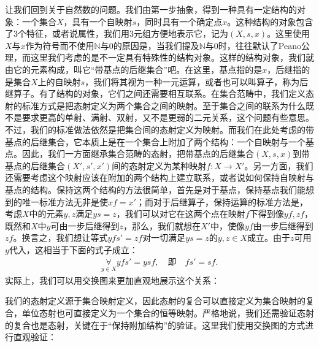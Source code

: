 \documentclass[oneside, 12pt]{ctexart}
\begin{document}
让我们回到关于自然数的问题。我们由第一步抽象，得到一种具有一定结构的对象：一个集合$X$，具有一个自映射$s$，同时具有一个确定点$x$。这种结构的对象包含了$3$个特征，或者说属性，我们用$3$元组方便地表示它，记为$(X, s, x)$。这里使用$X$与$x$作为符号而不使用$\mathbb{N}$与$0$的原因是，当我们提及$\mathbb{N}$与$0$时，往往默认了Peano公理，而这里我们考虑的是不一定具有特殊性的结构对象。这样的结构对象，我们就由它的元素构成，叫它“带基点的后继集合”吧。在这里，基点指的是$x$，后继指的是集合$X$上的自映射$s$，我们将其视为一种一元运算，或者也可以叫算子，称为后继算子。有了结构的对象，它们之间还需要相互联系。在集合范畴中，我们定义态射的标准方式是把态射定义为两个集合之间的映射。至于集合之间的联系为什么既不是要求更高的单射、满射、双射，又不是更弱的二元关系，这个问题有些意思。不过，我们的标准做法依然是把集合间的态射定义为映射。而我们在此处考虑的带基点的后继集合，它本质上是在一个集合上附加了两个结构：一个自映射与一个基点。因此，我们一方面继承集合范畴的态射，把带基点的后继集合$(X, s, x)$到带基点的后继集合$(X', s', x')$间的态射定义为某种映射$f \colon X \to X'$。另一方面，我们还需要考虑这个映射应该在附加的两个结构上建立联系，或者说如何保持自映射与基点的结构。保持这两个结构的方法很简单，首先是对于基点，保持基点我们能想到的唯一标准方法无非是使$xf = x'$；而对于后继算子，保持运算的标准方法是，考虑$X$中的元素$y, z$满足$ys = z$，我们可以对它在这两个点在映射$f$下得到像$yf, zf$，既然和$X$中$y$可由一步后继得到$z$，那么，我们就想在$X'$中，使像$yf$由一步后继得到$zf$。换言之，我们想让等式$yfs' = zf$对一切满足$ys = z$的$y,z \in X$成立。由于$z$可用$y$代入，这相当于下面的式子成立：
\begin{gather*}
	\mathop{\forall}\limits_{y \in X} yfs' = ysf, \quad \text{即} \quad fs' = sf.
\end{gather*}
实际上，我们可以用交换图来更加直观地展示这个关系：
\begin{center}
\end{center}
我们的态射定义源于集合映射定义，因此态射的复合可以直接定义为集合映射的复合，单位态射也可直接定义为一个集合的恒等映射。严格地说，我们还需验证态射的复合也是态射，关键在于“保持附加结构”的验证。这里我们使用交换图的方式进行直观验证：
\begin{center}
\end{center}
\end{document}
